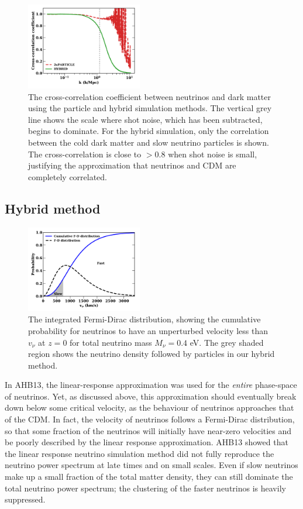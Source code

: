 \documentclass[useAMS, usenatbib]{mnras}
\begin{document}
\begin{figure}
\includegraphics[width=0.45\textwidth]{nuplots/corr_coeff-1.pdf}
  \caption{The cross-correlation coefficient between neutrinos and dark matter using the particle and hybrid simulation methods.
  The vertical grey line shows the scale where shot noise, which has been subtracted, begins to dominate.
  For the hybrid simulation, only the correlation between the cold dark matter and slow neutrino particles is shown.
  The cross-correlation is close to $> 0.8$ when shot noise is small, justifying the approximation that neutrinos and CDM are completely correlated.
  }
  \label{fig:cross-corr}
\end{figure}

\subsection{Hybrid method}
\label{sec:hybrid}

\begin{figure}
\includegraphics[width=0.45\textwidth]{nuplots/fermidirac.pdf}
  \caption{The integrated Fermi-Dirac distribution, showing the cumulative probability for neutrinos to have an unperturbed velocity less than $v_\nu$ at $z=0$ for total neutrino mass $M_\nu = 0.4$ eV.
  The grey shaded region shows the neutrino density followed by particles in our hybrid method.
  }
  \label{fig:fddistribution}
\end{figure}

In AHB13, the linear-response approximation was used for the \emph{entire} phase-space of neutrinos.
Yet, as discussed above, this approximation should eventually break down below some critical velocity, as the behaviour of neutrinos approaches that of the CDM. In fact, the velocity of neutrinos follows a Fermi-Dirac distribution, so that some fraction of the neutrinos will initially have near-zero velocities and be poorly described by the linear response approximation. AHB13 showed that the linear response neutrino simulation method did not fully reproduce the neutrino power spectrum at late times and on small scales.
Even if slow neutrinos make up a small fraction of the total matter density, they can still dominate the total neutrino power spectrum; the clustering of the faster neutrinos is heavily suppressed.
\end{document}
